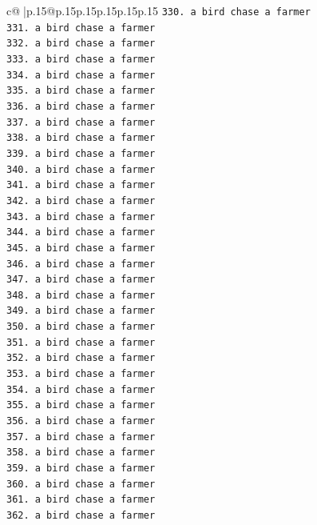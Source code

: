 \documentclass{article}
\begin{document}
{\begin{supertabular}{c@{$\;$}|p{.15\linewidth}@{}p{.15\linewidth}p{.15\linewidth}p{.15\linewidth}p{.15\linewidth}p{.15\linewidth}}
{{{\texttt{330. a bird chase a farmer} \\
\texttt{331. a bird chase a farmer} \\
\texttt{332. a bird chase a farmer} \\
\texttt{333. a bird chase a farmer} \\
\texttt{334. a bird chase a farmer} \\
\texttt{335. a bird chase a farmer} \\
\texttt{336. a bird chase a farmer} \\
\texttt{337. a bird chase a farmer} \\
\texttt{338. a bird chase a farmer} \\
\texttt{339. a bird chase a farmer} \\
\texttt{340. a bird chase a farmer} \\
\texttt{341. a bird chase a farmer} \\
\texttt{342. a bird chase a farmer} \\
\texttt{343. a bird chase a farmer} \\
\texttt{344. a bird chase a farmer} \\
\texttt{345. a bird chase a farmer} \\
\texttt{346. a bird chase a farmer} \\
\texttt{347. a bird chase a farmer} \\
\texttt{348. a bird chase a farmer} \\
\texttt{349. a bird chase a farmer} \\
\texttt{350. a bird chase a farmer} \\
\texttt{351. a bird chase a farmer} \\
\texttt{352. a bird chase a farmer} \\
\texttt{353. a bird chase a farmer} \\
\texttt{354. a bird chase a farmer} \\
\texttt{355. a bird chase a farmer} \\
\texttt{356. a bird chase a farmer} \\
\texttt{357. a bird chase a farmer} \\
\texttt{358. a bird chase a farmer} \\
\texttt{359. a bird chase a farmer} \\
\texttt{360. a bird chase a farmer} \\
\texttt{361. a bird chase a farmer} \\
\texttt{362. a bird chase a farmer} \\
}}}
\end{supertabular}}
\end{document}
